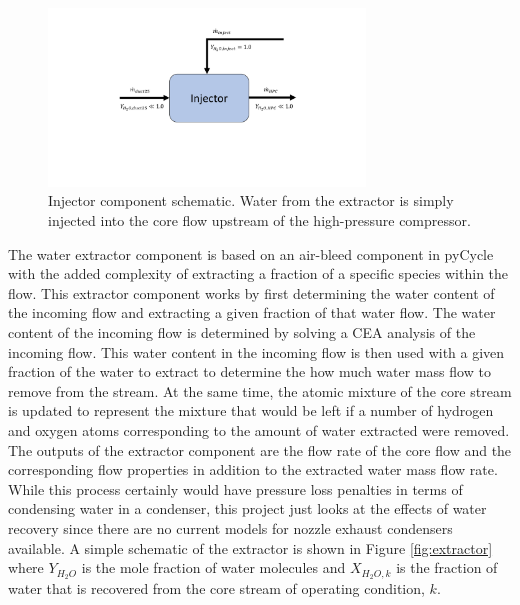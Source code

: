 \documentclass[conf]{new-aiaa}
\begin{document}
\begin{figure}[hbt!]
    \centering
    \includegraphics[width=0.75\textwidth]{injector.pdf}
    \caption{
        Injector component schematic.
        Water from the extractor is simply injected into the core flow upstream of the high-pressure compressor.
    }
    \label{fig:injector}
\end{figure}

The water extractor component is based on an air-bleed component in pyCycle with the added complexity of extracting a fraction of a specific species within the flow.
This extractor component works by first determining the water content of the incoming flow and extracting a given fraction of that water flow.
The water content of the incoming flow is determined by solving a CEA analysis of the incoming flow.
This water content in the incoming flow is then used with a given fraction of the water to extract to determine the how much water mass flow to remove from the stream.
At the same time, the atomic mixture of the core stream is updated to represent the mixture that would be left if a number of hydrogen and oxygen atoms corresponding to the amount of water extracted were removed.
The outputs of the extractor component are the flow rate of the core flow and the corresponding flow properties in addition to the extracted water mass flow rate.
While this process certainly would have pressure loss penalties in terms of condensing water in a condenser, this project just looks at the effects of water recovery since there are no current models for nozzle exhaust condensers available.
A simple schematic of the extractor is shown in Figure \ref{fig:extractor} where $Y_{H_2O}$ is the mole fraction of water molecules and $X_{H_2O,k}$ is the fraction of water that is recovered from the core stream of operating condition, $k$.
\end{document}
